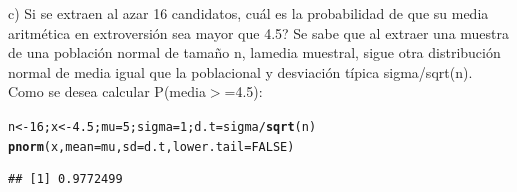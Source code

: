 \documentclass[12pt,letterpaper]{article}\usepackage[]{graphicx}\usepackage[]{color}
\makeatletter
\newcommand{\hlnum}[1]{\textcolor[rgb]{0.686,0.059,0.569}{#1}}%
\newcommand{\hlopt}[1]{\textcolor[rgb]{0,0,0}{#1}}%
\newcommand{\hlstd}[1]{\textcolor[rgb]{0.345,0.345,0.345}{#1}}%
\newcommand{\hlkwb}[1]{\textcolor[rgb]{0.69,0.353,0.396}{#1}}%
\newcommand{\hlkwc}[1]{\textcolor[rgb]{0.333,0.667,0.333}{#1}}%
\newcommand{\hlkwd}[1]{\textcolor[rgb]{0.737,0.353,0.396}{\textbf{#1}}}%
\newenvironment{kframe}{%
 \def\at@end@of@kframe{}%
 \ifinner\ifhmode%
  \def\at@end@of@kframe{\end{minipage}}%
  \begin{minipage}{\columnwidth}%
 \fi\fi%
 \def\FrameCommand##1{\hskip\@totalleftmargin \hskip-\fboxsep
 \colorbox{shadecolor}{##1}\hskip-\fboxsep
     \hskip-\linewidth \hskip-\@totalleftmargin \hskip\columnwidth}%
 \MakeFramed {\advance\hsize-\width
   \@totalleftmargin\z@ \linewidth\hsize
   \@setminipage}}%
 {\par\unskip\endMakeFramed%
 \at@end@of@kframe}
\newenvironment{knitrout}{}{} %
\makeatother
\begin{document}
\begin{description}
  \item c) Si se extraen al azar 16 candidatos, \¿cu\'al es la probabilidad de que su media aritm\'etica en extroversi\'on sea mayor que 4.5? 
Se sabe que al extraer una muestra de una poblaci\'on normal de tama\~no n, lamedia muestral, sigue otra distribuci\'on normal de media igual que la poblacional y desviaci\'on t\'ipica sigma/sqrt(n).\\

Como se desea calcular P(media$>$=4.5):
\begin{knitrout}
\color{fgcolor}\begin{kframe}
\begin{alltt}
\hlstd{n} \hlkwb{<-} \hlnum{16}\hlstd{; x} \hlkwb{<-} \hlnum{4.5}\hlstd{; mu}\hlkwb{=}\hlnum{5}\hlstd{; sigma}\hlkwb{=}\hlnum{1}\hlstd{; d.t}\hlkwb{=}\hlstd{sigma}\hlopt{/}\hlkwd{sqrt}\hlstd{(n)}
\hlkwd{pnorm}\hlstd{(x,} \hlkwc{mean}\hlstd{=mu,} \hlkwc{sd}\hlstd{=d.t,} \hlkwc{lower.tail}\hlstd{=}\hlnum{FALSE}\hlstd{)}
\end{alltt}
\begin{verbatim}
## [1] 0.9772499
\end{verbatim}
\end{kframe}
\end{knitrout}
\end{description}
\end{document}
